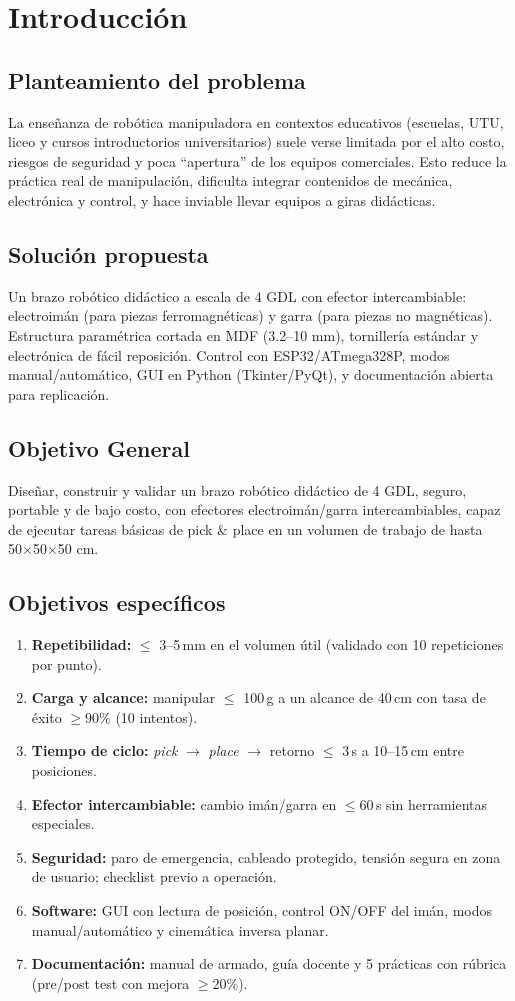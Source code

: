 \section{Introducción}
\subsection{Planteamiento del problema}
La enseñanza de robótica manipuladora en contextos educativos (escuelas, UTU, liceo y cursos introductorios universitarios) suele verse limitada por el alto costo, riesgos de seguridad y poca “apertura” de los equipos comerciales. Esto reduce la práctica real de manipulación, dificulta integrar contenidos de mecánica, electrónica y control, y hace inviable llevar equipos a giras didácticas.

\subsection{Solución propuesta}
Un brazo robótico didáctico a escala de 4 GDL con efector intercambiable: electroimán (para piezas ferromagnéticas) y garra (para piezas no magnéticas). Estructura paramétrica cortada en MDF (3.2–10 mm), tornillería estándar y electrónica de fácil reposición. Control con ESP32/ATmega328P, modos manual/automático, GUI en Python (Tkinter/PyQt), y documentación abierta para replicación.

\subsection{Objetivo General}
Diseñar, construir y validar un brazo robótico didáctico de 4 GDL, seguro, portable y de bajo costo, con efectores electroimán/garra intercambiables, capaz de ejecutar tareas básicas de pick \& place en un volumen de trabajo de hasta 50×50×50 cm.

\subsection{Objetivos específicos}
\begin{enumerate}
  \item \textbf{Repetibilidad:} $\leq$ 3--5\,mm en el volumen útil (validado con 10 repeticiones por punto).
  \item \textbf{Carga y alcance:} manipular $\leq$ 100\,g a un alcance de 40\,cm con tasa de éxito $\geq 90\%$ (10 intentos).
  \item \textbf{Tiempo de ciclo:} \emph{pick} $\rightarrow$ \emph{place} $\rightarrow$ retorno $\leq$ 3\,s a 10--15\,cm entre posiciones.
  \item \textbf{Efector intercambiable:} cambio imán/garra en $\leq 60$\,s sin herramientas especiales.
  \item \textbf{Seguridad:} paro de emergencia, cableado protegido, tensión segura en zona de usuario; checklist previo a operación.
  \item \textbf{Software:} GUI con lectura de posición, control ON/OFF del imán, modos manual/automático y cinemática inversa planar.
  \item \textbf{Documentación:} manual de armado, guía docente y 5 prácticas con rúbrica (pre/post test con mejora $\geq 20\%$).
\end{enumerate}